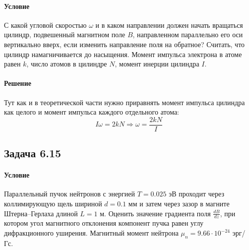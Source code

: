\documentclass[12pt]{article}
\begin{document}
\paragraph{Условие}
С какой угловой скоростью $\omega$ и в каком направлении должен начать вращаться цилиндр, подвешенный магнитном поле $B$, направленном параллельно его оси вертикально вверх, если изменить направление поля на обратное? Считать, что цилиндр намагничивается до насыщения. Момент импульса электрона в атоме равен $k$, число атомов в
цилиндре $N$, момент инерции цилиндра $I$.
\paragraph{Решение}
Тут как и в теоретической части нужно приравнять момент импульса цилиндра как целого и момент импульса каждого отдельного атома:
\begin{equation*}
    I\omega = 2kN \Rightarrow \omega = \dfrac{2kN}{I}
\end{equation*}

\subsection{Задача 6.15}
\label{task_6.15}
\paragraph{Условие}
Параллельный пучок нейтронов с энергией $T = 0.025$ эВ проходит через коллимирующую щель шириной $ d= 0.1$ мм и затем через зазор в магните Штерна–Герлаха длиной $L = 1$ м. Оценить значение градиента поля $\frac{dB}{dz}$, при котором угол магнитного отклонения компонент пучка равен углу дифракционного уширения. Магнитный момент нейтрона $\mu_n = 9.66 \cdot 10^{−24}$ эрг/Гс.
\end{document}
